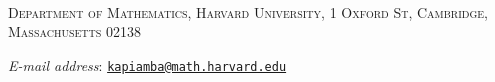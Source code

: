 \documentclass[12pt,letterpaper]{amsart}
\numberwithin{equation}{section}
\theoremstyle{remark}
\theoremstyle{definition}
\newcommand{\sm}{\setminus}
\newcommand{\C}{\mathbb C}
\newcommand{\R}{\mathbb R}
\newcommand{\QQ}{\mathcal Q}
\DeclareMathOperator{\Exp}{Exp}
\begin{document}
%		
%		
%	
		
	\renewcommand*{\bibfont}{\small}
	\printbibliography
	\ \\
	\noindent\textsc{\small Department of Mathematics, Harvard University, 1 Oxford St, Cambridge, Massachusetts 02138}\par\nopagebreak
	\medskip
	\noindent\textit{E-mail address}: \href{mailto:kapiamba@math.harvard.edu}{\texttt{kapiamba@math.harvard.edu}}
		
\end{document}
